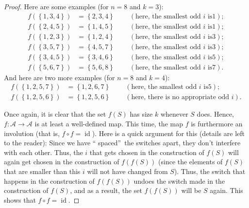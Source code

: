 \begin{proof}
Here are some examples (for $n=8$ and $k=3$):%
\begin{align*}
f\left(  \left\{  1,3,4\right\}  \right)   &  =\left\{  2,3,4\right\}
\ \ \ \ \ \ \ \ \ \ \left(  \text{here, the smallest odd }i\text{ is
}1\right)  ;\\
f\left(  \left\{  2,4,5\right\}  \right)   &  =\left\{  1,4,5\right\}
\ \ \ \ \ \ \ \ \ \ \left(  \text{here, the smallest odd }i\text{ is
}1\right)  ;\\
f\left(  \left\{  1,2,3\right\}  \right)   &  =\left\{  1,2,4\right\}
\ \ \ \ \ \ \ \ \ \ \left(  \text{here, the smallest odd }i\text{ is
}3\right)  ;\\
f\left(  \left\{  3,5,7\right\}  \right)   &  =\left\{  4,5,7\right\}
\ \ \ \ \ \ \ \ \ \ \left(  \text{here, the smallest odd }i\text{ is
}3\right)  ;\\
f\left(  \left\{  3,4,5\right\}  \right)   &  =\left\{  3,4,6\right\}
\ \ \ \ \ \ \ \ \ \ \left(  \text{here, the smallest odd }i\text{ is
}5\right)  ;\\
f\left(  \left\{  5,6,7\right\}  \right)   &  =\left\{  5,6,8\right\}
\ \ \ \ \ \ \ \ \ \ \left(  \text{here, the smallest odd }i\text{ is
}7\right)  .
\end{align*}
And here are two more examples (for $n=8$ and $k=4$):%
\begin{align*}
f\left(  \left\{  1,2,5,7\right\}  \right)   &  =\left\{  1,2,6,7\right\}
\ \ \ \ \ \ \ \ \ \ \left(  \text{here, the smallest odd }i\text{ is
}5\right)  ;\\
f\left(  \left\{  1,2,5,6\right\}  \right)   &  =\left\{  1,2,5,6\right\}
\ \ \ \ \ \ \ \ \ \ \left(  \text{here, there is no appropriate odd }i\right)
.
\end{align*}


Once again, it is clear that the set $f\left(  S\right)  $ has size $k$
whenever $S$ does. Hence, $f:\mathcal{A}\rightarrow\mathcal{A}$ is at least a
well-defined map. This time, the map $f$ is furthermore an involution (that
is, $f\circ f=\operatorname*{id}$). Here is a quick argument for this (details
are left to the reader): Since we have \textquotedblleft
spaced\textquotedblright\ the switches apart, they don't interfere with each
other. Thus, the $i$ that gets chosen in the construction of $f\left(
S\right)  $ will again get chosen in the construction of $f\left(  f\left(
S\right)  \right)  $ (since the elements of $f\left(  S\right)  $ that are
smaller than this $i$ will not have changed from $S$). Thus, the switch that
happens in the construction of $f\left(  f\left(  S\right)  \right)  $ undoes
the switch made in the construction of $f\left(  S\right)  $, and as a result,
the set $f\left(  f\left(  S\right)  \right)  $ will be $S$ again. This shows
that $f\circ f=\operatorname*{id}$.


\end{proof}
